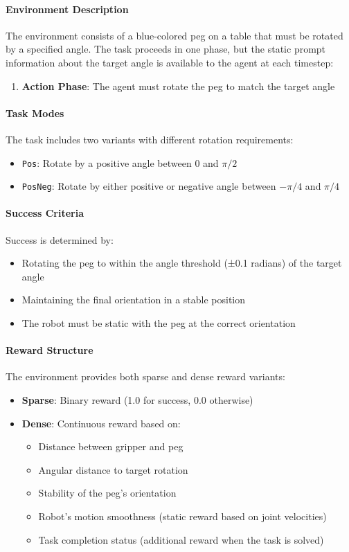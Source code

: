 \paragraph{Environment Description} The environment consists of a blue-colored peg on a table that must be rotated by a specified angle. The task proceeds in one phase, but the static prompt information about the target angle is available to the agent at each timestep:
\begin{enumerate}
    \item \textbf{Action Phase}: The agent must rotate the peg to match the target angle
\end{enumerate}

\paragraph{Task Modes} The task includes two variants with different rotation requirements:
\begin{itemize}
    \item \texttt{Pos}: Rotate by a positive angle between 0 and $\pi/2$
    \item \texttt{PosNeg}: Rotate by either positive or negative angle between $-\pi/4$ and $\pi/4$
\end{itemize}

\paragraph{Success Criteria} Success is determined by:
\begin{itemize}
    \item Rotating the peg to within the angle threshold (±0.1 radians) of the target angle
    \item Maintaining the final orientation in a stable position
    \item The robot must be static with the peg at the correct orientation
\end{itemize}

\paragraph{Reward Structure} The environment provides both sparse and dense reward variants:
\begin{itemize}
    \item \textbf{Sparse}: Binary reward (1.0 for success, 0.0 otherwise)
    \item \textbf{Dense}: Continuous reward based on:
    \begin{itemize}
        \item Distance between gripper and peg
        \item Angular distance to target rotation
        \item Stability of the peg's orientation
        \item Robot's motion smoothness (static reward based on joint velocities)
        \item Task completion status (additional reward when the task is solved)
    \end{itemize}
\end{itemize}


